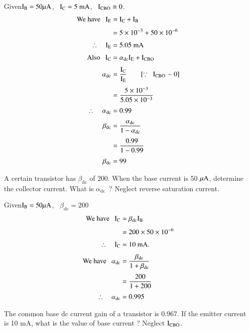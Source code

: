 \begin{solution}
Given\quad $\textrm{I}_{\textrm{B}}=50\mu\textrm{A}$, \ $\textrm{I}_{\textrm{C}}=5\text{~mA}$, \ $\textrm{I}_{\text{CBO}}\cong 0$.
\begin{align*}
\text{We have~~ } \textrm{I}_{\textrm{E}} &= \textrm{I}_{\textrm{C}}+\textrm{I}_{\textrm{B}}\\[3pt]
&= 5\times 10^{-3}+50\times 10^{-6}\\[3pt]
\therefore\quad \textrm{I}_{\textrm{E}} &= 5.05\text{~mA}\\[3pt]
\text{Also~~ } \textrm{I}_{\textrm{C}} &= \alpha_{\text{dc}}\textrm{I}_{\textrm{E}}+\textrm{I}_{\text{CBO}}\\[3pt]
\alpha_{\text{dc}} &= \frac{\textrm{I}_{\textrm{C}}}{\textrm{I}_{\textrm{E}}}\qquad [\because \ \ \textrm{I}_{\text{CBO}}\sim 0]\\[3pt]
&= \frac{5\times 10^{-3}}{5.05\times 10^{-3}}\\[3pt]
\therefore\quad \alpha_{\text{dc}} &= 0.99\\[3pt]
\beta_{\text{dc}} &= \frac{\alpha_{\text{dc}}}{1-\alpha_{\text{dc}}}\\[3pt]
&= \frac{0.99}{1-0.99}\\[3pt]
\beta_{\text{dc}} &= 99
\end{align*}
\end{solution}

\begin{problem}\label{prob2.6}
A certain transistor has $\beta_{\text{dc}}$ of 200. When the base current is 50 $\mu\textrm{A}$, determine the collector current. What is $\alpha_{\text{dc}}$~? Neglect reverse saturation current.
\end{problem}

\begin{solution}
Given\quad $\textrm{I}_{\textrm{B}}=50\mu\textrm{A}$, \ $\beta_{\text{dc}}=200$
\begin{align*}
\text{We have~~ } \textrm{I}_{\textrm{C}} &\simeq \beta_{\text{dc}}\textrm{I}_{\textrm{B}}\\[3pt]
&= 200\times 50\times 10^{-6}\\[3pt]
\therefore\quad \textrm{I}_{\textrm{C}} &= 10\text{~mA.}\\[3pt]
\text{We have~~ } \alpha_{\text{dc}} &= \frac{\beta_{\text{dc}}}{1+\beta_{\text{dc}}}\\[3pt]
&= \frac{200}{1+200}\\[3pt]
\therefore\quad \alpha_{\text{dc}} &= 0.995
\end{align*}
\end{solution}

\begin{problem}\label{prob2.7}
The common base dc current gain of a transistor is 0.967. If the emitter current is 10 mA, what is the value of base current ? Neglect $\textrm{I}_{\text{CBO}}$.
\end{problem}

